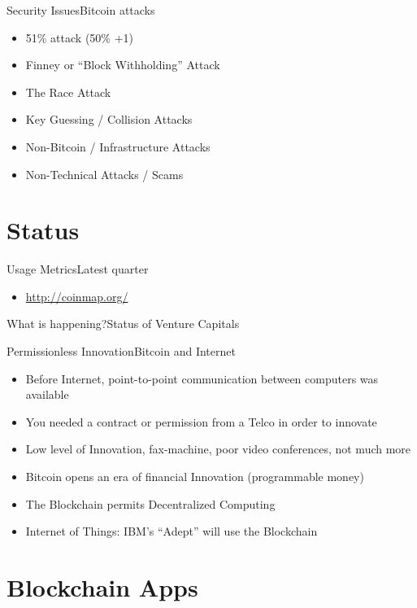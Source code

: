 \documentclass[english,compress]{beamer}
\begin{document}
\begin{frame}{Security Issues}{Bitcoin attacks}
\begin{itemize}
 \item 51\% attack (50\% +1)
 \item Finney or “Block Withholding” Attack
 \item The Race Attack
 \item Key Guessing / Collision Attacks
 \item Non-Bitcoin / Infrastructure Attacks
 \item Non-Technical Attacks / Scams
\end{itemize}
\end{frame}

\section{Status}

\begin{frame}{Usage Metrics}{Latest quarter}
\begin{itemize}
 \item \url{http://coinmap.org/} 
\end{itemize}
\end{frame}

\begin{frame}{What is happening?}{Status of Venture Capitals}
\end{frame}

\begin{frame}{Permissionless Innovation}{Bitcoin and Internet}
\begin{itemize}
 \item Before Internet, point-to-point communication between computers was available
 \item You needed a contract or permission from a Telco in order to innovate
 \item Low level of Innovation, fax-machine, poor video conferences, not much more
 \item Bitcoin opens an era of financial Innovation (programmable money)
 \item The Blockchain permits Decentralized Computing
 \item Internet of Things: IBM's ``Adept'' will use the Blockchain 
\end{itemize}
\end{frame}

\section{Blockchain Apps}
\end{document}
